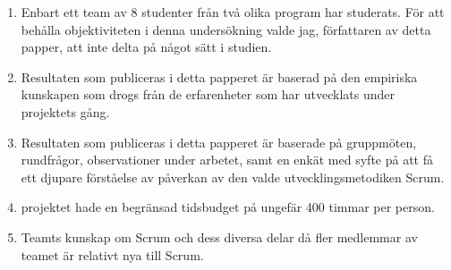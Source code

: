 \begin{enumerate}
\item [\textbullet ] Enbart ett team av 8 studenter från två olika program har studerats. För att behålla objektiviteten i denna undersökning valde jag, författaren av detta papper, att inte delta på något sätt i studien.

\item[\textbullet]  Resultaten som publiceras i detta papperet är baserad på den empiriska kunskapen som drogs från de erfarenheter som har utvecklats under projektets gång.

\item[\textbullet]  Resultaten som publiceras i detta papperet är baserade på gruppmöten, rundfrågor, observationer under arbetet, samt en enkät med syfte på att få ett djupare förståelse av påverkan av den valde utvecklingsmetodiken Scrum. 

\item [\textbullet]  projektet hade en begränsad tidsbudget på ungefär 400 timmar per person. 

\item[\textbullet] Teamts kunskap om Scrum och dess diversa delar då fler medlemmar av teamet är relativt nya till Scrum.
\end{enumerate}

 
